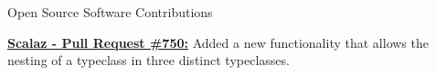 \documentclass{resume} %
\begin{document}



\begin{rSection}{Open Source Software Contributions}

\begin{rSubsection}{}{}{}{}
\item \textbf{\href{https://github.com/scalaz/scalaz/pull/750}{Scalaz - Pull Request \#750:}} Added a new functionality that allows the nesting of a typeclass in three distinct typeclasses.
\end{rSubsection}

\end{rSection}
\end{document}

